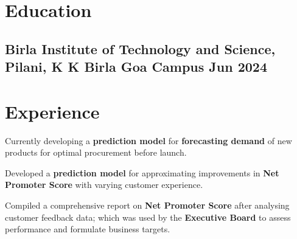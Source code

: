 \documentclass[]{deedy-resume-openfont}
\begin{document}
%
%
\lastupdated

%
%

%
%

\section{Education} 

\subsection{Birla Institute of Technology and Science, Pilani, K K Birla Goa Campus \hfill Jun 2024}
\newline 
{}
\sectionsep

%
%

\section{Experience}

\begin{tightemize}

\item Currently developing a \textbf{prediction model} for \textbf{forecasting demand} of new products for optimal procurement before launch.

\item Developed a \textbf{prediction model} for approximating improvements in \textbf{Net Promoter Score} with varying customer experience.

\item Compiled a comprehensive report on \textbf{Net Promoter Score} after analysing customer feedback data; which was used by the \textbf{Executive Board} to assess performance and formulate business targets.

\end{tightemize}
\sectionsep
\end{document}

